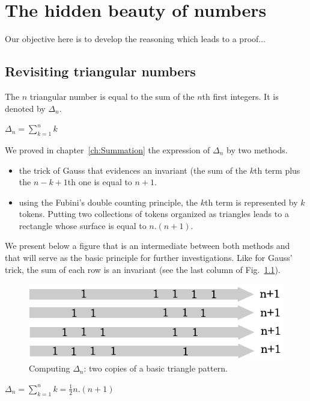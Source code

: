 
\chapter{The hidden beauty of numbers}
\label{Appendix:Tetra}

Our objective here is to develop the reasoning which leads to a proof...

\section{Revisiting triangular numbers}

The $n$ triangular number is equal to the sum of the $n$th first integers.
It is denoted by $\Delta_n$.

$\Delta_n =  \sum_{k=1}^{n} k$

We proved in chapter~\ref{ch:Summation} the expression of $\Delta_n$ by two methods.
\begin{itemize}
\item the trick of Gauss that evidences an invariant (the sum of the $k$th term plus the $n-k+1$th one
is equal to $n+1$. 
\item using the Fubini's double counting principle, the $k$th term is represented by $k$ tokens.
Putting two collections of tokens organized as triangles leads to a rectangle whose surface is equal to $n.(n+1)$.
\end{itemize}
We present below a figure that is an intermediate between both methods and that will serve as the basic principle for further investigations.
Like for Gauss' trick, the sum of each row is an invariant (see the last column of Fig.~\ref{fig:Tetrahedral2}). 

\begin{figure}[h]
\begin{center}
        \includegraphics[scale=0.4]{FiguresArithmetic/appTetrahedral2}
        \caption{Computing $\Delta_n$: two copies of a basic triangle pattern.}
        \label{fig:Tetrahedral2}
\end{center}
\end{figure}
$\Delta_n =  \sum_{k=1}^{n} k = \frac{1}{2}n.(n+1)$


